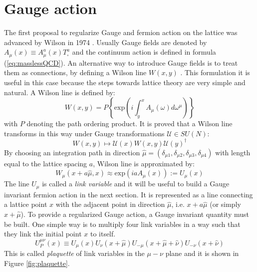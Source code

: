 \documentclass[english, LaM, oneside, noexaminfo]{sapthesis}
\begin{document}
\section{Gauge action}
\noindent
The first proposal to regularize Gauge and fermion action on the lattice was advanced by Wilson in 1974 \cite{Wilson-Confinement-of-Quarks}.
Usually Gauge fields are denoted by $A_\mu (x) \equiv A_\mu^a(x)T^a_{\square}$ and the continuum action is defined in formula (\ref{eq:masslessQCD}).
An alternative way to introduce Gauge fields is to treat them as connections, by defining a Wilson line $W(x,y)$ \cite{Schwartz}.
This formulation it is useful in this case because the steps towards lattice theory are very simple and natural.
A Wilson line is defined by:
\begin{equation*}
    W(x,y) = P \left\{\text{exp}\left(i\int_y^x A_\mu(\omega)d\omega^\mu\right)\right\}
\end{equation*}
with $P$ denoting the path ordering product.
It is proved that a Wilson line transforms in this way under Gauge transformations $\mathcal{U}\in SU(N)$:
\begin{equation}\label{eq:wline-transformation}
    W(x,y) \longmapsto \mathcal{U}(x) W(x,y) \mathcal{U}(y)^\dagger
\end{equation}
By choosing an integration path in direction $\hat\mu = (\delta_{\mu 1},\delta_{\mu 2},\delta_{\mu 3},\delta_{\mu 4})$ with length equal to the lattice spacing $a$, Wilson line is approximated by:
\begin{equation*}
    W_\mu(x+a\hat\mu, x) \approx \text{exp}\left(iaA_\mu (x)\right) := U_\mu (x)
\end{equation*}
The line $U_\mu$ is called a {\it link variable} and it will be useful to build a Gauge invariant fermion action in the next section.
It is represented as a line connecting a lattice point $x$ with the adjacent point in direction $\hat\mu$, i.e. $x+a\hat\mu$ (or simply $x+\hat\mu$).
\newline
To provide a regularized Gauge action, a Gauge invariant quantity must be built.
One simple way is to multiply four link variables in a way such that they link the initial point $x$ to itself.
\begin{equation*}
    U_P^{\mu\nu}(x) \equiv U_\mu (x) U_\nu (x+\hat\mu) U_{-\mu} (x+\hat\mu+\hat\nu) U_{-\nu} (x+\hat\nu)
\end{equation*}
This is called {\it plaquette} of link variables in the $\mu-\nu$ plane and it is shown in Figure \ref{fig:plaquette}.
\end{document}
